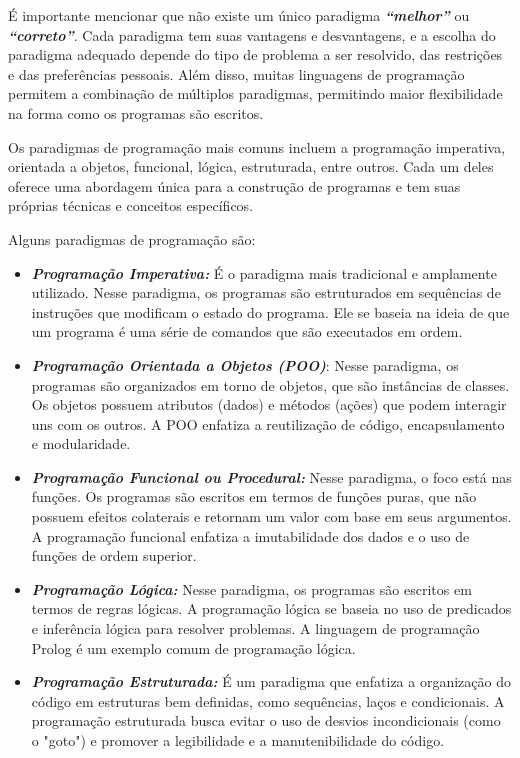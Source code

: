 \documentclass[a4paper, 12pt, onecolumn,singlespacing]{article}
\begin{document}
	É importante mencionar que não existe um único paradigma \textbf{\textit{``melhor''}} ou \textbf{\textit{``correto''}}. Cada paradigma tem suas vantagens e desvantagens, e a escolha do paradigma adequado depende do tipo de problema a ser resolvido, das restrições e das preferências pessoais. Além disso, muitas linguagens de programação permitem a combinação de múltiplos paradigmas, permitindo maior flexibilidade na forma como os programas são escritos.
	
	Os paradigmas de programação mais comuns incluem a programação imperativa, orientada a objetos, funcional, lógica, estruturada, entre outros. Cada um deles oferece uma abordagem única para a construção de programas e tem suas próprias técnicas e conceitos específicos.
	
	Alguns paradigmas de programação são:
	
	\begin{itemize}
		\item \textbf{\textit{Programação Imperativa: }}É o paradigma mais tradicional e amplamente utilizado. Nesse paradigma, os programas são estruturados em sequências de instruções que modificam o estado do programa. Ele se baseia na ideia de que um programa é uma série de comandos que são executados em ordem.
		
		\item \textbf{\textit{Programação Orientada a Objetos (POO)}}: Nesse paradigma, os programas são organizados em torno de objetos, que são instâncias de classes. Os objetos possuem atributos (dados) e métodos (ações) que podem interagir uns com os outros. A POO enfatiza a reutilização de código, encapsulamento e modularidade.
		
		\item \textbf{\textit{Programação Funcional ou Procedural:}} Nesse paradigma, o foco está nas funções. Os programas são escritos em termos de funções puras, que não possuem efeitos colaterais e retornam um valor com base em seus argumentos. A programação funcional enfatiza a imutabilidade dos dados e o uso de funções de ordem superior.
		
		\item \textbf{\textit{Programação Lógica:}} Nesse paradigma, os programas são escritos em termos de regras lógicas. A programação lógica se baseia no uso de predicados e inferência lógica para resolver problemas. A linguagem de programação Prolog é um exemplo comum de programação lógica.
		
		\item \textbf{\textit{Programação Estruturada:}} É um paradigma que enfatiza a organização do código em estruturas bem definidas, como sequências, laços e condicionais. A programação estruturada busca evitar o uso de desvios incondicionais (como o "goto") e promover a legibilidade e a manutenibilidade do código.
		
	\end{itemize}
	
\end{document}
